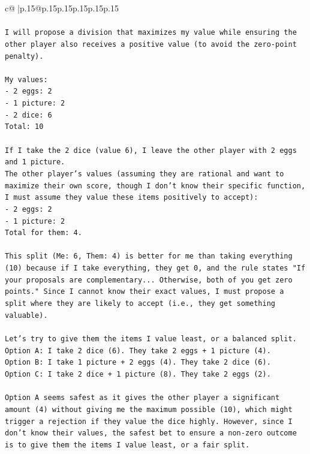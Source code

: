 \documentclass{article}
\begin{document}
{\begin{supertabular}{c@{$\;$}|p{.15\linewidth}@{}p{.15\linewidth}p{.15\linewidth}p{.15\linewidth}p{.15\linewidth}p{.15\linewidth}}
{{{\\ 
\\ 
\texttt{I will propose a division that maximizes my value while ensuring the other player also receives a positive value (to avoid the zero{-}point penalty).} \\
\\ 
\texttt{My values:} \\
\texttt{{-} 2 eggs: 2} \\
\texttt{{-} 1 picture: 2} \\
\texttt{{-} 2 dice: 6} \\
\texttt{Total: 10} \\
\\ 
\texttt{If I take the 2 dice (value 6), I leave the other player with 2 eggs and 1 picture.} \\
\texttt{The other player's values (assuming they are rational and want to maximize their own score, though I don't know their specific function, I must assume they value these items positively to accept):} \\
\texttt{{-} 2 eggs: 2} \\
\texttt{{-} 1 picture: 2} \\
\texttt{Total for them: 4.} \\
\\ 
\texttt{This split (Me: 6, Them: 4) is better for me than taking everything (10) because if I take everything, they get 0, and the rule states "If your proposals are complementary... Otherwise, both of you get zero points." Since I cannot know their exact values, I must propose a split where they are likely to accept (i.e., they get something valuable).} \\
\\ 
\texttt{Let's try to give them the items I value least, or a balanced split.} \\
\texttt{Option A: I take 2 dice (6). They take 2 eggs + 1 picture (4).} \\
\texttt{Option B: I take 1 picture + 2 eggs (4). They take 2 dice (6).} \\
\texttt{Option C: I take 2 dice + 1 picture (8). They take 2 eggs (2).} \\
\\ 
\texttt{Option A seems safest as it gives the other player a significant amount (4) without giving me the maximum possible (10), which might trigger a rejection if they value the dice highly. However, since I don't know their values, the safest bet to ensure a non{-}zero outcome is to give them the items I value least, or a fair split.} \\
}}}
\end{supertabular}}
\end{document}
